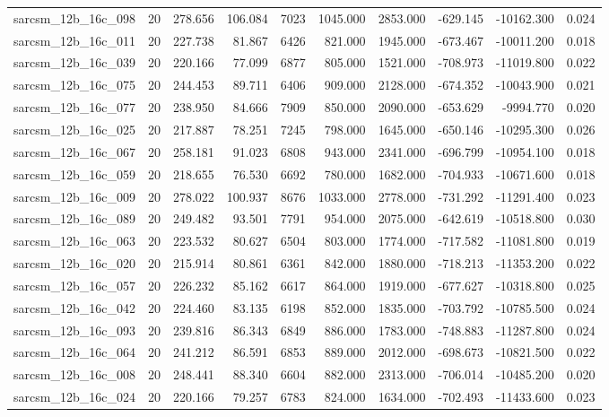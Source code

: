 \begin{tabular}{lrrrrrrrrr}
sarcsm\_12b\_16c\_098 & 20 & 278.656 & 106.084 & 7023 & 1045.000 & 2853.000 & -629.145 & -10162.300 & 0.024 \\
sarcsm\_12b\_16c\_011 & 20 & 227.738 & 81.867 & 6426 & 821.000 & 1945.000 & -673.467 & -10011.200 & 0.018 \\
sarcsm\_12b\_16c\_039 & 20 & 220.166 & 77.099 & 6877 & 805.000 & 1521.000 & -708.973 & -11019.800 & 0.022 \\
sarcsm\_12b\_16c\_075 & 20 & 244.453 & 89.711 & 6406 & 909.000 & 2128.000 & -674.352 & -10043.900 & 0.021 \\
sarcsm\_12b\_16c\_077 & 20 & 238.950 & 84.666 & 7909 & 850.000 & 2090.000 & -653.629 & -9994.770 & 0.020 \\
sarcsm\_12b\_16c\_025 & 20 & 217.887 & 78.251 & 7245 & 798.000 & 1645.000 & -650.146 & -10295.300 & 0.026 \\
sarcsm\_12b\_16c\_067 & 20 & 258.181 & 91.023 & 6808 & 943.000 & 2341.000 & -696.799 & -10954.100 & 0.018 \\
sarcsm\_12b\_16c\_059 & 20 & 218.655 & 76.530 & 6692 & 780.000 & 1682.000 & -704.933 & -10671.600 & 0.018 \\
sarcsm\_12b\_16c\_009 & 20 & 278.022 & 100.937 & 8676 & 1033.000 & 2778.000 & -731.292 & -11291.400 & 0.023 \\
sarcsm\_12b\_16c\_089 & 20 & 249.482 & 93.501 & 7791 & 954.000 & 2075.000 & -642.619 & -10518.800 & 0.030 \\
sarcsm\_12b\_16c\_063 & 20 & 223.532 & 80.627 & 6504 & 803.000 & 1774.000 & -717.582 & -11081.800 & 0.019 \\
sarcsm\_12b\_16c\_020 & 20 & 215.914 & 80.861 & 6361 & 842.000 & 1880.000 & -718.213 & -11353.200 & 0.022 \\
sarcsm\_12b\_16c\_057 & 20 & 226.232 & 85.162 & 6617 & 864.000 & 1919.000 & -677.627 & -10318.800 & 0.025 \\
sarcsm\_12b\_16c\_042 & 20 & 224.460 & 83.135 & 6198 & 852.000 & 1835.000 & -703.792 & -10785.500 & 0.024 \\
sarcsm\_12b\_16c\_093 & 20 & 239.816 & 86.343 & 6849 & 886.000 & 1783.000 & -748.883 & -11287.800 & 0.024 \\
sarcsm\_12b\_16c\_064 & 20 & 241.212 & 86.591 & 6853 & 889.000 & 2012.000 & -698.673 & -10821.500 & 0.022 \\
sarcsm\_12b\_16c\_008 & 20 & 248.441 & 88.340 & 6604 & 882.000 & 2313.000 & -706.014 & -10485.200 & 0.020 \\
sarcsm\_12b\_16c\_024 & 20 & 220.166 & 79.257 & 6783 & 824.000 & 1634.000 & -702.493 & -11433.600 & 0.023 \\

\end{tabular}
